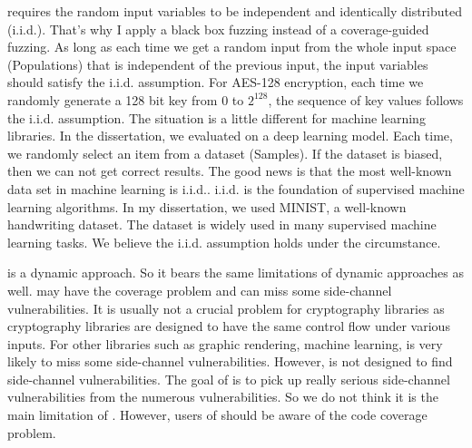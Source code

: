 \ctool{} requires the random input variables to be independent and identically distributed (i.i.d.). That's why I apply a black box fuzzing instead of a coverage-guided fuzzing. As long as each time we get a random input from the whole input space (Populations) that is independent of the previous input, the input variables should satisfy the i.i.d. assumption. For AES-128 encryption, each time we randomly generate a 128 bit key from $0$ to $2^{128}$, the sequence of key values follows the i.i.d. assumption. The situation is a little different for machine learning libraries. In the dissertation, we evaluated \ctool{} on a deep learning model. Each time, we randomly select an item from a dataset (Samples). If the dataset is biased, then we can not get correct results. The good news is that the most well-known data set in machine learning is i.i.d.. i.i.d. is the foundation of supervised machine learning algorithms. In my dissertation, we used MINIST, a well-known handwriting dataset. The dataset is widely used in many supervised machine learning tasks.  We believe the i.i.d. assumption holds under the circumstance.

\ctool{} is a dynamic approach. So it bears the same limitations of dynamic approaches as well. \ctool{} may have the coverage problem and can miss some side-channel vulnerabilities. It is usually not a crucial problem for cryptography libraries as cryptography libraries are designed to have the same control flow under various inputs. For other libraries such as graphic rendering, machine learning, \ctool{} is very likely to miss some side-channel vulnerabilities. However, \ctool{} is not designed to find side-channel vulnerabilities. The goal of \ctool{} is to pick up really serious side-channel vulnerabilities from the numerous vulnerabilities. So we do not think it is the main limitation of \ctool{}. However, users of \ctool{} should be aware of the code coverage problem. 

